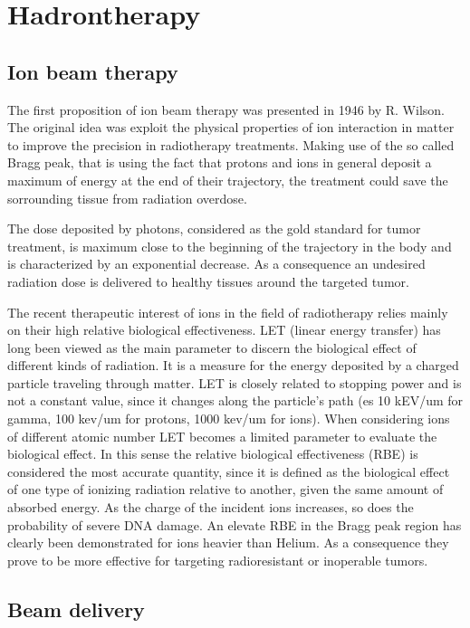 \section{Hadrontherapy}
\subsection{Ion beam therapy}

The first proposition of ion beam therapy was presented in 1946 by R. Wilson. The original idea was exploit the physical properties of ion interaction in matter to improve the precision in radiotherapy treatments.  
Making use of the so called Bragg peak, that is using the fact that protons and ions in general deposit a maximum of energy at the end of their trajectory, the treatment could save the sorrounding tissue from radiation overdose.

The dose deposited by photons, considered as the gold standard for tumor treatment, is maximum close to the beginning of the trajectory in the body and is characterized by an exponential decrease. As a consequence an undesired radiation dose is delivered to healthy tissues around the targeted tumor.

The recent therapeutic interest of ions in the field of radiotherapy relies mainly on their high relative biological effectiveness.
LET (linear energy transfer) has long been viewed as the main parameter to discern the biological effect of different kinds of radiation. It is a measure for the energy deposited by a charged particle traveling through matter. LET is closely related to stopping power and is not a constant value, since it changes along the particle's path (es 10 kEV/um for gamma, 100 kev/um for protons, 1000 kev/um for ions).
When considering ions of different atomic number LET becomes a limited parameter to evaluate the biological effect. In this sense the relative biological effectiveness (RBE) is considered the most accurate quantity, since it is defined as the biological effect of one type of ionizing radiation relative to another, given the same amount of absorbed energy. As the charge of the incident ions increases, so does the probability of severe DNA damage. An elevate RBE in the Bragg peak region has clearly been demonstrated for ions heavier than Helium.
As a consequence they prove to be more effective for targeting radioresistant or inoperable tumors.

\subsection{Beam delivery}

